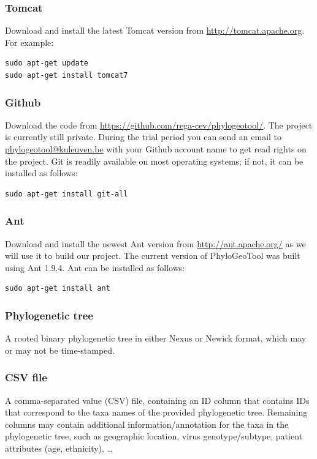 \documentclass[a4paper, 11pt]{article} %
\begin{document}
\subsubsection*{Tomcat}
Download and install the latest Tomcat version from \url{http://tomcat.apache.org}.
For example:
\begin{verbatim}
sudo apt-get update
sudo apt-get install tomcat7
\end{verbatim}

\subsubsection*{Github}
Download the code from \url{https://github.com/rega-cev/phylogeotool/}. 
The project is currently still private. 
During the trial period you can send an email to \href{mailto:phylogeotool@kuleuven.be}  {phylogeotool@kuleuven.be} with your Github account name to get read rights on the project.
Git is readily available on most operating systems; if not, it can be installed as follows:
\begin{verbatim}
sudo apt-get install git-all
\end{verbatim}

\subsubsection*{Ant}
Download and install the newest Ant version from \url{http://ant.apache.org/} as we will use it to build our project.
The current version of PhyloGeoTool was built using Ant 1.9.4.
Ant can be installed as follows:
\begin{verbatim}
sudo apt-get install ant
\end{verbatim}

\subsubsection*{Phylogenetic tree}
A rooted binary phylogenetic tree in either Nexus or Newick format, which may or may not be time-stamped.

\subsubsection*{CSV file}
A comma-separated value (CSV) file, containing an ID column that contains IDs that correspond to the taxa names of the provided phylogenetic tree.
Remaining columns may contain additional information/annotation for the taxa in the phylogenetic tree, such as geographic location, virus genotype/subtype, patient attributes (age, ethnicity), \ldots
\end{document}
